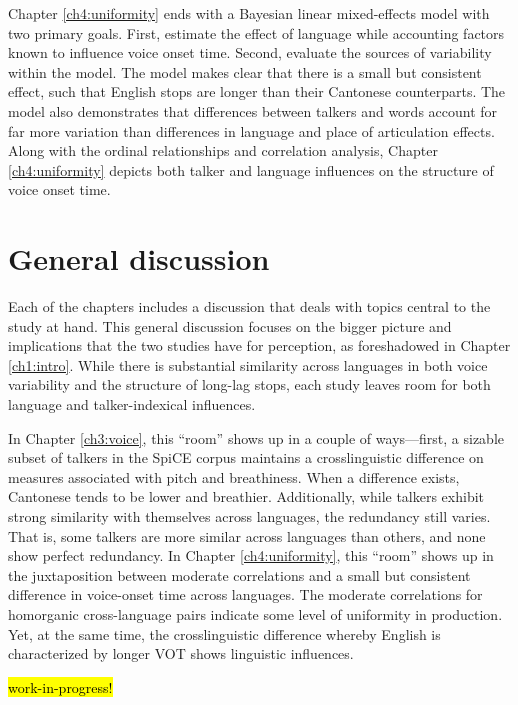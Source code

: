 Chapter \ref{ch4:uniformity} ends with a Bayesian linear mixed-effects model with two primary goals. First, estimate the effect of language while accounting factors known to influence voice onset time. Second, evaluate the sources of variability within the model. The model makes clear that there is a small but consistent effect, such that English stops are longer than their Cantonese counterparts. The model also demonstrates that differences between talkers and words account for far more variation than differences in language and place of articulation effects. Along with the ordinal relationships and correlation analysis, Chapter \ref{ch4:uniformity} depicts both talker and language influences on the structure of voice onset time. 

\section{General discussion}\label{ch5:sec:discussion}

Each of the chapters includes a discussion that deals with topics central to the study at hand. This general discussion focuses on the bigger picture and implications that the two studies have for perception, as foreshadowed in Chapter \ref{ch1:intro}. While there is substantial similarity across languages in both voice variability and the structure of long-lag stops, each study leaves room for both language and talker-indexical influences. 

In Chapter \ref{ch3:voice}, this ``room'' shows up in a couple of ways---first, a sizable subset of talkers in the SpiCE corpus maintains a crosslinguistic difference on measures associated with pitch and breathiness. When a difference exists, Cantonese tends to be lower and breathier. Additionally, while talkers exhibit strong similarity with themselves across languages, the redundancy still varies. That is, some talkers are more similar across languages than others, and none show perfect redundancy. In Chapter \ref{ch4:uniformity}, this ``room'' shows up in the juxtaposition between moderate correlations and a small but consistent difference in voice-onset time across languages. The moderate correlations for homorganic cross-language pairs indicate some level of uniformity in production. Yet, at the same time, the crosslinguistic difference whereby English is characterized by longer VOT shows linguistic influences. 

\hl{work-in-progress!}


